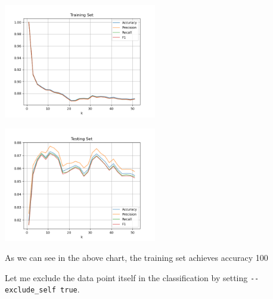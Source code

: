\includegraphics[width=0.5\textwidth]{./figures/knn_credit_approval_adj_training_False.png}

\includegraphics[width=0.5\textwidth]{./figures/knn_credit_approval_adj_testing_False.png}


As we can see in the above chart, the training set achieves accuracy 100%

Let me exclude the data point itself in the classification by setting \verb|--exclude_self true|.




